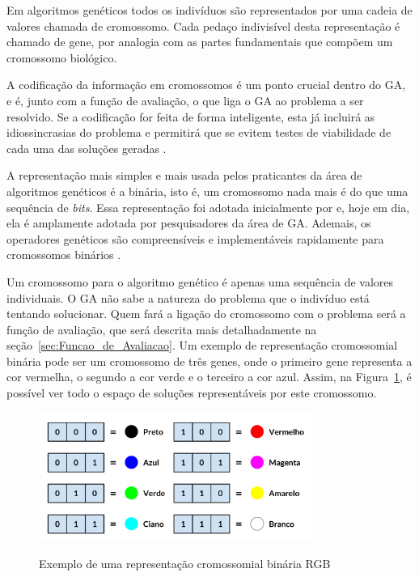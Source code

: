 \documentclass[12pt,oneside,a4paper,english,french,spanish,brazil,]{abntex2}
\begin{document}
Em algoritmos genéticos todos os indivíduos são representados por uma cadeia de valores chamada de cromossomo. Cada pedaço indivisível desta representação é chamado de gene, por analogia com as partes fundamentais que compõem um cromossomo biológico.

A codificação da informação em cromossomos é um ponto crucial dentro do GA, e é, junto com a função de avaliação, o que liga o GA ao problema a ser resolvido. Se a codificação for feita de forma inteligente, esta já incluirá as idiossincrasias do problema e permitirá que se evitem testes de viabilidade de cada uma das soluções geradas \cite{linden:2008}.

A representação mais simples e mais usada pelos praticantes da área de algoritmos genéticos é a binária, isto é, um cromossomo nada mais é do que uma sequência de \textit{bits}. Essa representação foi adotada inicialmente por \citet{holland:1992} e, hoje em dia, ela é amplamente adotada por pesquisadores da área de GA. Ademais, os operadores genéticos são compreensíveis e implementáveis rapidamente para cromossomos binários \cite{linden:2008}.

Um cromossomo para o algoritmo genético é apenas uma sequência de valores individuais. O GA não sabe a natureza do problema que o indivíduo está tentando solucionar. Quem fará a ligação do cromossomo com o problema será a função de avaliação, que será descrita mais detalhadamente na seção~\ref{sec:Funcao_de_Avaliacao}. Um exemplo de representação cromossomial binária pode ser um cromossomo de três genes, onde o primeiro gene representa a cor vermelha, o segundo a cor verde e o terceiro a cor azul. Assim, na Figura~\ref{fig:GA_Cromossomo_RGB}, é possível ver todo o espaço de soluções representáveis por este cromossomo.

\begin{figure}[ht]
\centering
\caption{Exemplo de uma representação cromossomial binária RGB}
\includegraphics[width=0.8\textwidth]{imagens/GA_Cromossomo_RGB.pdf}
\sourceAuthor	
\label{fig:GA_Cromossomo_RGB}
\end{figure}
\end{document}
